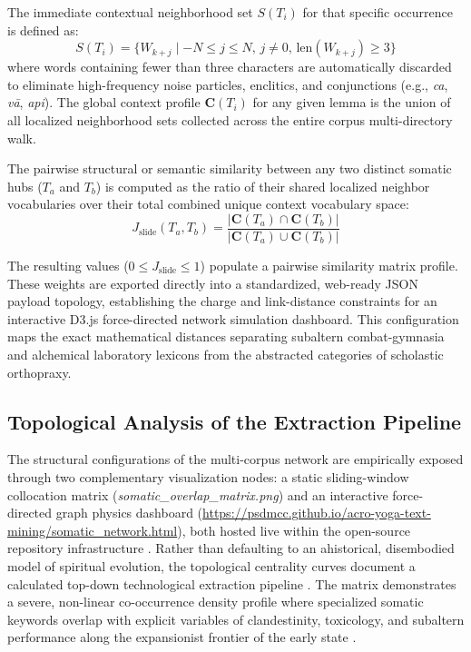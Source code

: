 \documentclass[11pt,twoside,letterpaper]{article}
\begin{document}
The immediate contextual neighborhood set $S(T_i)$ for that specific occurrence is defined as:
\begin{equation}
S(T_i) = \{ W_{k+j} \mid -N \le j \le N, \, j \neq 0, \, \text{len}(W_{k+j}) \ge 3 \}
\end{equation}
where words containing fewer than three characters are automatically discarded to eliminate high-frequency noise particles, enclitics, and conjunctions (e.g., \textit{ca}, \textit{vā}, \textit{api}). The global context profile $\mathbf{C}(T_i)$ for any given lemma is the union of all localized neighborhood sets collected across the entire corpus multi-directory walk.

The pairwise structural or semantic similarity between any two distinct somatic hubs ($T_a$ and $T_b$) is computed as the ratio of their shared localized neighbor vocabularies over their total combined unique context vocabulary space:
\begin{equation}
J_{\text{slide}}(T_a, T_b) = \frac{\vert \mathbf{C}(T_a) \cap \mathbf{C}(T_b) \vert}{\vert \mathbf{C}(T_a) \cup \mathbf{C}(T_b) \vert}
\end{equation}

The resulting values ($0 \le J_{\text{slide}} \le 1$) populate a pairwise similarity matrix profile. These weights are exported directly into a standardized, web-ready JSON payload topology, establishing the charge and link-distance constraints for an interactive D3.js force-directed network simulation dashboard. This configuration maps the exact mathematical distances separating subaltern combat-gymnasia and alchemical laboratory lexicons from the abstracted categories of scholastic orthopraxy.


\subsection{Topological Analysis of the Extraction Pipeline}

The structural configurations of the multi-corpus network are empirically exposed through two complementary visualization nodes: a static sliding-window collocation matrix (\textit{somatic\_overlap\_matrix.png}) and an interactive force-directed graph physics dashboard (\url{https://psdmcc.github.io/acro-yoga-text-mining/somatic_network.html}), both hosted live within the open-source repository infrastructure \cite{McCartney2021}. Rather than defaulting to an ahistorical, disembodied model of spiritual evolution, the topological centrality curves document a calculated top-down technological extraction pipeline \cite{Mallinson2017}. The matrix demonstrates a severe, non-linear co-occurrence density profile where specialized somatic keywords overlap with explicit variables of clandestinity, toxicology, and subaltern performance along the expansionist frontier of the early state \cite{Mallinson2017, McCartney2021}. 
\end{document}
